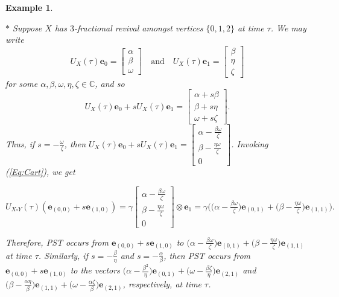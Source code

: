 \documentclass{article}
\numberwithin{equation}{section}
\newtheorem{ex}[lemma]{Example}
\newcommand{\be}{\mathbf e}
\def\C{\mathbb{C}}
\begin{document}
{\begin{ex}
\label{4.2}
{\rm{
 $*$ Suppose $X$ has $3$-fractional revival amongst vertices $\{0,1,2\}$ at time $\tau$. We may write
$$U_{X}(\tau)\be_{0}=\begin{bmatrix}\alpha \\ \beta \\ \omega\end{bmatrix}\quad \text{and}\quad U_{X}(\tau)\be_{1}=\begin{bmatrix}\beta \\ \eta \\ \zeta\end{bmatrix}$$
for some $\alpha,\beta,\omega,\eta,\zeta\in\C$, and so
$$U_{X}(\tau)\be_{0}+sU_{X}(\tau)\be_{1}=\begin{bmatrix}\alpha+s\beta\\ \beta+s\eta \\ \omega+s\zeta\end{bmatrix}.$$
Thus, if $s=-\frac{\omega}{\zeta}$, then $U_{X}(\tau)\be_{0}+sU_{X}(\tau)\be_{1}=\begin{bmatrix}\alpha-\frac{\beta\omega}{\zeta}\\ \beta-\frac{\eta\omega}{\zeta} \\ 0\end{bmatrix}$. Invoking (\ref{Eq:Cart}), we get
\begin{center}
$U_{X\square Y}(\tau)(\be_{(0,0)}+s\be_{(1,0)})
=\gamma \begin{bmatrix}\alpha-\frac{\beta\omega}{\zeta}\\ \beta-\frac{\eta\omega}{\zeta} \\ 0\end{bmatrix}\otimes \be_{1}=\gamma\bigg(\big(\alpha-\frac{\beta\omega}{\zeta}\big)\be_{(0,1)}+\big(\beta-\frac{\eta\omega}{\zeta}\big)\be_{(1,1)}\bigg).$
\end{center}
Therefore, PST occurs from $\be_{(0,0)}+s\be_{(1,0)}$ to $\big(\alpha-\frac{\beta\omega}{\zeta}\big)\be_{(0,1)}+\big(\beta-\frac{\eta\omega}{\zeta}\big)\be_{(1,1)}$ at time $\tau$. Similarly, if $s=-\frac{\beta}{\eta}$ and $s=-\frac{\alpha}{\beta}$, then PST occurs from $\be_{(0,0)}+s\be_{(1,0)}$ to the vectors $\big(\alpha-\frac{\beta^2}{\eta}\big)\be_{(0,1)}+\big(\omega-\frac{\beta\zeta}{\eta}\big)\be_{(2,1)}$ and $\big(\beta-\frac{\alpha\eta}{\beta}\big)\be_{(1,1)}+\big(\omega-\frac{\alpha\zeta}{\beta}\big)\be_{(2,1)}$, respectively, at time $\tau$.}}


\end{ex}}
\end{document}
